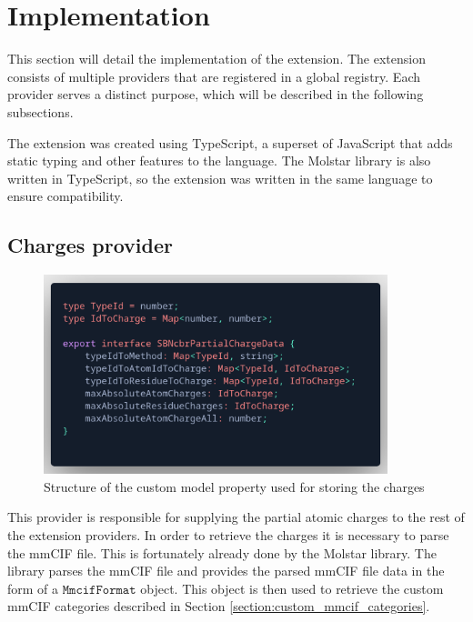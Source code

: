 \documentclass[
  digital,     %
  oneside,     %
  nosansbold,  %
  nocolorbold, %
  lof,         %
  lot,         %
]{fithesis4}
\begin{document}
\section{Implementation}

This section will detail the implementation of the extension. The extension consists of multiple providers that are registered in a global registry. Each provider serves a distinct purpose, which will be described in the following subsections.

The extension was created using TypeScript, a superset of JavaScript that adds static typing and other features to the language. The Molstar library is also written in TypeScript, so the extension was written in the same language to ensure compatibility.

\subsection{Charges provider}
\label{subsection:charges_provider}

\begin{figure}
  \begin{center}
    \includegraphics[width=10cm]{figures/charge_data_structure.png}
  \end{center}
  \caption{Structure of the custom model property used for storing the charges}
  \label{figure:charge_data_structure}
\end{figure}

This provider is responsible for supplying the partial atomic charges to the rest of the extension providers.
In order to retrieve the charges it is necessary to parse the mmCIF file.
This is fortunately already done by the Molstar library.
The library parses the mmCIF file and provides the parsed mmCIF file data in the form of a $\texttt{MmcifFormat}$ object.
This object is then used to retrieve the custom mmCIF categories described in Section \ref{section:custom_mmcif_categories}.
\end{document}
